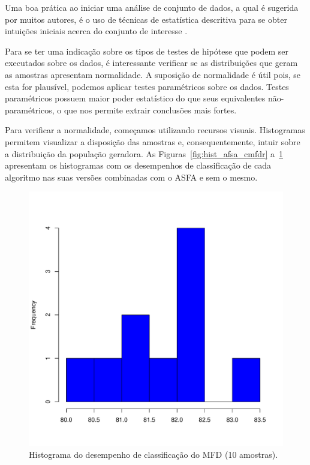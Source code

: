 \documentclass[conference]{IEEEtran}
\begin{document}
Uma boa prática ao iniciar uma análise de conjunto de dados, a qual é sugerida por muitos autores, é o uso de técnicas de estatística descritiva para se obter intuições iniciais acerca do conjunto de interesse \cite{montgomery2010applied}.

Para se ter uma indicação sobre os tipos de testes de hipótese que podem ser executados sobre os dados, é interessante verificar se as distribuições que geram as amostras apresentam normalidade.
A suposição de normalidade é útil pois, se esta for plausível, podemos aplicar testes paramétricos sobre os dados.
Testes paramétricos possuem maior poder estatístico do que seus equivalentes não-paramétricos, o que nos permite extrair conclusões mais fortes.

Para verificar a normalidade, começamos utilizando recursos visuais.
Histogramas permitem visualizar a disposição das amostras e, consequentemente, intuir sobre a distribuição da população geradora.
As Figuras~\ref{fig:hist_afsa_cmfdr} a~\ref{fig:hist_mfd} apresentam os histogramas com os desempenhos de classificação de cada algoritmo  nas suas versões combinadas com o ASFA e sem o mesmo.

\begin{figure}[h]
	\centering
	\includegraphics[width=\linewidth]{img/bluehist_mfd.pdf}
	\caption{Histograma do desempenho de classificação do MFD (10 amostras).}
	\label{fig:hist_mfd}
\end{figure}
\end{document}
